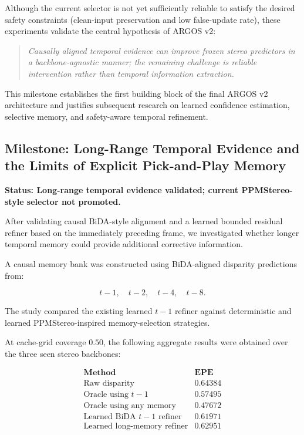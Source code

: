 \documentclass[11pt,a4paper]{article}
\begin{document}
Although the current selector is not yet sufficiently reliable to satisfy the desired safety constraints (clean-input preservation and low false-update rate), these experiments validate the central hypothesis of ARGOS v2:

\begin{quote}
\emph{Causally aligned temporal evidence can improve frozen stereo predictors in a backbone-agnostic manner; the remaining challenge is reliable intervention rather than temporal information extraction.}
\end{quote}

This milestone establishes the first building block of the final ARGOS v2 architecture and justifies subsequent research on learned confidence estimation, selective memory, and safety-aware temporal refinement.

\subsection{Milestone: Long-Range Temporal Evidence and the Limits of Explicit Pick-and-Play Memory}

\textbf{Status: Long-range temporal evidence validated; current PPMStereo-style selector not promoted.}

After validating causal BiDA-style alignment and a learned bounded residual refiner based on the immediately preceding frame, we investigated whether longer temporal memory could provide additional corrective information.

A causal memory bank was constructed using BiDA-aligned disparity predictions from:

\[
t-1,\quad t-2,\quad t-4,\quad t-8.
\]

The study compared the existing learned \(t-1\) refiner against deterministic and learned PPMStereo-inspired memory-selection strategies.

At cache-grid coverage \(0.50\), the following aggregate results were obtained over the three seen stereo backbones:

\[
\begin{array}{l|c}
\textbf{Method} & \textbf{EPE} \\
\hline
\text{Raw disparity} & 0.64384 \\
\text{Oracle using } t-1 & 0.57495 \\
\text{Oracle using any memory} & 0.47672 \\
\text{Learned BiDA } t-1 \text{ refiner} & 0.61971 \\
\text{Learned long-memory refiner} & 0.62951
\end{array}
\]
\end{document}
